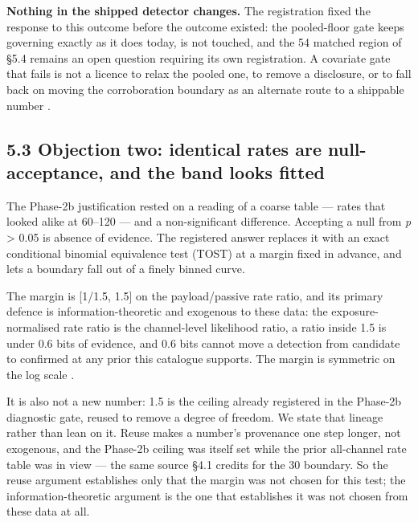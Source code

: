 \documentclass[11pt]{article}
\begin{document}
\textbf{Nothing in the shipped detector changes.} The registration fixed the response to this outcome before the outcome existed: the pooled-floor gate keeps governing  exactly as it does today,  is not touched, and the 54\textdegree{} matched region of \S{}5.4 remains an open question requiring its own registration. A covariate gate that fails is not a licence to relax the pooled one, to remove a disclosure, or to fall back on moving the corroboration boundary as an alternate route to a shippable number%
.

\subsection*{5.3 Objection two: identical rates are null-acceptance, and the band looks fitted}

The Phase-2b justification rested on a reading of a coarse table --- rates that looked alike at 60--120\textdegree{} --- and a non-significant difference. Accepting a null from \emph{p} > 0.05 is absence of evidence. The registered answer replaces it with an exact conditional binomial equivalence test (TOST) at a margin fixed in advance, and lets a boundary fall out of a finely binned curve.

The margin is [1/1.5, 1.5] on the payload/passive rate ratio, and its primary defence is information-theoretic and exogenous to these data: the exposure-normalised rate ratio is the channel-level likelihood ratio, a ratio inside 1.5 is under 0.6 bits of evidence, and 0.6 bits cannot move a detection from candidate to confirmed at any prior this catalogue supports. The margin is symmetric on the log scale%
.

It is also not a new number: 1.5 is the ceiling already registered in the Phase-2b diagnostic gate, reused to remove a degree of freedom. We state that lineage rather than lean on it. Reuse makes a number's provenance one step longer, not exogenous, and the Phase-2b ceiling was itself set while the prior all-channel rate table was in view --- the same source \S{}4.1 credits for the 30\textdegree{} boundary. So the reuse argument establishes only that the margin was not chosen for this test; the information-theoretic argument is the one that establishes it was not chosen from these data at all.
\end{document}
